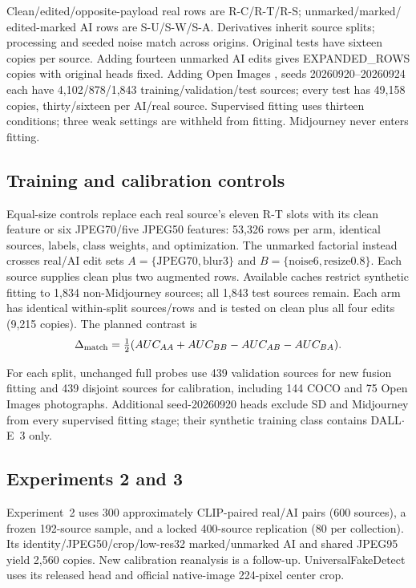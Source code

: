 \documentclass[conference]{IEEEtran}
\begin{document}
Clean/edited/opposite-payload real rows are R-C/R-T/R-S; unmarked/marked/
edited-marked AI rows are S-U/S-W/S-A. Derivatives inherit source splits;
processing and seeded noise match across origins. Original tests have
sixteen copies per source. Adding fourteen unmarked AI edits gives
{{EXPANDED_ROWS}} copies with original heads fixed. Adding Open Images
\cite{openimages}, seeds 20260920--20260924 each have
4,102/878/1,843 training/validation/test sources; every test has 49,158
copies, thirty/sixteen per AI/real source. Supervised fitting uses thirteen
conditions; three weak settings are withheld from fitting. Midjourney never
enters fitting.

\subsection{Training and calibration controls}
Equal-size controls replace each real source's eleven R-T slots with its
clean feature or six JPEG70/five JPEG50 features: 53,326 rows per arm,
identical sources, labels, class weights, and optimization.
The unmarked factorial instead crosses real/AI edit sets
$A=\{\mathrm{JPEG70},\mathrm{blur3}\}$ and
$B=\{\mathrm{noise6},\mathrm{resize0.8}\}$. Each source supplies clean plus
two augmented rows. Available caches restrict synthetic fitting to 1,834
non-Midjourney sources; all 1,843 test sources remain. Each arm has identical
within-split sources/rows and is tested on clean plus all four edits
(9,215 copies). The planned contrast is
\begin{equation}\Delta_{\rm match}=\tfrac12(AUC_{AA}+AUC_{BB}-AUC_{AB}-AUC_{BA}).\end{equation}

For each split, unchanged full probes use 439 validation sources for new
fusion fitting and 439 disjoint sources for calibration, including 144 COCO
and 75 Open Images photographs. Additional seed-20260920 heads exclude SD
and Midjourney from every supervised fitting stage; their synthetic training
class contains DALL$\cdot$E~3 only.

\subsection{Experiments 2 and 3}
Experiment~2 uses 300 approximately CLIP-paired real/AI pairs (600 sources),
a frozen 192-source sample, and a locked 400-source replication (80 per
collection). Its identity/JPEG50/crop/low-res32 marked/unmarked AI and shared
JPEG95 yield 2,560 copies. New calibration reanalysis is a follow-up.
UniversalFakeDetect uses its released head and official native-image
224-pixel center crop.
\end{document}
